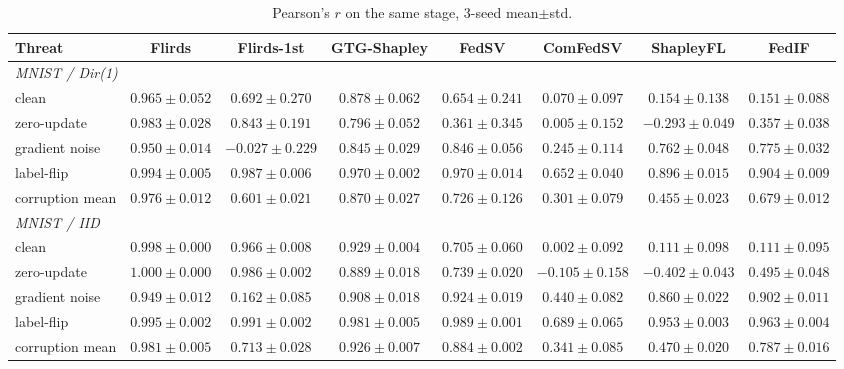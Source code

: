 \documentclass[letterpaper]{article} %
\theoremstyle{plain}
\begin{document}
\begin{table}[t]
\centering
\small
\setlength{\tabcolsep}{4pt}
\caption{Pearson's $r$ on the same stage, 3-seed mean$\pm$std.}
\label{tab:mnist-pearson}
\begin{tabular}{lccccccc}
\hline
Threat & Flirds & Flirds-1st & GTG-Shapley & FedSV & ComFedSV & ShapleyFL & FedIF \\
\hline
\multicolumn{8}{l}{\emph{MNIST / Dir(1)}} \\
clean & $0.965\pm0.052$ & $0.692\pm0.270$ & $0.878\pm0.062$ & $0.654\pm0.241$ & $0.070\pm0.097$ & $0.154\pm0.138$ & $0.151\pm0.088$ \\
zero-update & $0.983\pm0.028$ & $0.843\pm0.191$ & $0.796\pm0.052$ & $0.361\pm0.345$ & $0.005\pm0.152$ & $-0.293\pm0.049$ & $0.357\pm0.038$ \\
gradient noise & $0.950\pm0.014$ & $-0.027\pm0.229$ & $0.845\pm0.029$ & $0.846\pm0.056$ & $0.245\pm0.114$ & $0.762\pm0.048$ & $0.775\pm0.032$ \\
label-flip & $0.994\pm0.005$ & $0.987\pm0.006$ & $0.970\pm0.002$ & $0.970\pm0.014$ & $0.652\pm0.040$ & $0.896\pm0.015$ & $0.904\pm0.009$ \\
corruption mean & $0.976\pm0.012$ & $0.601\pm0.021$ & $0.870\pm0.027$ & $0.726\pm0.126$ & $0.301\pm0.079$ & $0.455\pm0.023$ & $0.679\pm0.012$ \\
\hline
\multicolumn{8}{l}{\emph{MNIST / IID}} \\
clean & $0.998\pm0.000$ & $0.966\pm0.008$ & $0.929\pm0.004$ & $0.705\pm0.060$ & $0.002\pm0.092$ & $0.111\pm0.098$ & $0.111\pm0.095$ \\
zero-update & $1.000\pm0.000$ & $0.986\pm0.002$ & $0.889\pm0.018$ & $0.739\pm0.020$ & $-0.105\pm0.158$ & $-0.402\pm0.043$ & $0.495\pm0.048$ \\
gradient noise & $0.949\pm0.012$ & $0.162\pm0.085$ & $0.908\pm0.018$ & $0.924\pm0.019$ & $0.440\pm0.082$ & $0.860\pm0.022$ & $0.902\pm0.011$ \\
label-flip & $0.995\pm0.002$ & $0.991\pm0.002$ & $0.981\pm0.005$ & $0.989\pm0.001$ & $0.689\pm0.065$ & $0.953\pm0.003$ & $0.963\pm0.004$ \\
corruption mean & $0.981\pm0.005$ & $0.713\pm0.028$ & $0.926\pm0.007$ & $0.884\pm0.002$ & $0.341\pm0.085$ & $0.470\pm0.020$ & $0.787\pm0.016$ \\
\hline
\end{tabular}
\end{table}
\end{document}
